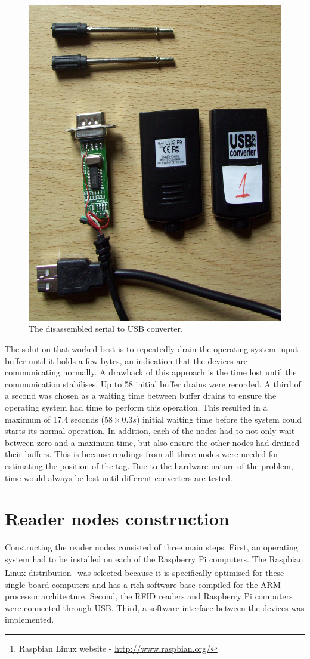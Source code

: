 \begin{figure}[h]
	\begin{center}
		\includegraphics[width=.6\textwidth]{figures/converter2}
		\caption{The disassembled serial to USB converter.}
		\label{fig:converter}
	\end{center}
\end{figure}

The solution that worked best is to repeatedly drain the operating system input buffer until it holds a few bytes, an indication that the devices are communicating normally. A drawback of this approach is the time lost until the communication stabilises. Up to 58 initial buffer drains were recorded. A third of a second was chosen as a waiting time between buffer drains to ensure the operating system had time to perform this operation. This resulted in a maximum of 17.4 seconds ($58 \times 0.3s$) initial waiting time before the system could starts its normal operation. In addition, each of the nodes had to not only wait between zero and a maximum time, but also ensure the other nodes had drained their buffers. This is because readings from all three nodes were needed for estimating the position of the tag. Due to the hardware nature of the problem, time would always be lost until different converters are tested.


\section{Reader nodes construction}
\label{sec:constread}

Constructing the reader nodes consisted of three main steps. First, an operating system had to be installed on each of the Raspberry Pi computers. The Raspbian Linux distribution\footnote{Raspbian Linux website - \url{http://www.raspbian.org/}} was selected because it is specifically optimised for these single-board computers and has a rich software base compiled for the ARM processor architecture. Second, the RFID readers and Raspberry Pi computers were connected through USB. Third, a software interface between the devices was implemented.

